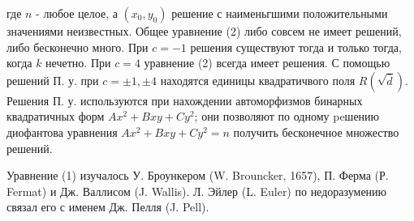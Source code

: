 \documentclass[10pt]{article}
\begin{document}
где $n$ - любое целое, а $\left(x_{0}, y_{0}\right)$ решение с наименьгшими положительными значениями неизвестных. Общее уравнение (2) либо совсем не имеет решений, либо бесконечно много. При $c=-1$ решения существуют тогда и только тогда, когда $k$ нечетно. При $c=4$ уравнение (2) всегда имеет решения. С помощью решений П. у. при $c= \pm 1, \pm 4$ находятся единицы квадратичвого поля $R(\sqrt{\bar{d}})$. Решения П. у. используются при нахождении автоморфизмов бинарных квадратичных форм $A x^{2}+B x y+C y^{2}$; они позволяют по одному peшению диофантова уравнения $A x^{2}+B x y+C y^{2}=n$ получить бесконечное множество решений.

Уравнение (1) изучалось У. Броункером (W. Brouncker, 1657), П. Ферма (Р. Fermat) и Дж. Валлисом (J. Wallis). Л. Эйлер (L. Euler) по недоразумению связал его с именем Дж. Пелля (J. Pell).
\end{document}
